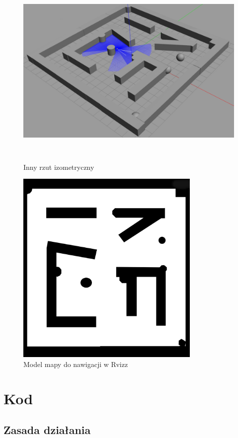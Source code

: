 \documentclass[12pt]{article}
\begin{document}
\begin{figure}[!htb]
    \centering
    \includegraphics[height=9.5cm]{./images/mapa2.png}
    \caption{Inny rzut izometryczny}
\end{figure}


\begin{figure}[!htb]
    \centering
    \includegraphics[height=9.5cm]{./images/rviz.png}
    \caption{Model mapy do nawigacji w Rvizz}
\end{figure}



\clearpage\newpage
\section{Kod}

\subsection{Zasada działania}
\end{document}
